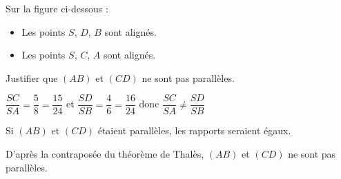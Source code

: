 \begin{corrige}
    \phantom{rrr}

    \begin{multicols}{2}
        Sur la figure ci-dessous :
        \begin{itemize}
            \item Les points $S$, $D$, $B$ sont alignés.
            \item Les points $S$, $C$, $A$ sont alignés.
        \end{itemize}

        \columnbreak
        Justifier que $(AB)$ et $(CD)$ ne sont pas parallèles. 
        
        \smallskip
        {\color{red} $\dfrac{SC}{SA}=\dfrac{5}{8}=\dfrac{15}{24}$ et $\dfrac{SD}{SB}=\dfrac{4}{6}=\dfrac{16}{24}$ donc $\dfrac{SC}{SA}\neq \dfrac{SD}{SB}$
        
        \smallskip
        Si $(AB)$ et $(CD)$ étaient parallèles, les rapports seraient égaux.

        D'après la contraposée du théorème de Thalès, $(AB)$ et $(CD)$ ne sont pas parallèles.
        }
    \end{multicols}

\end{corrige}


